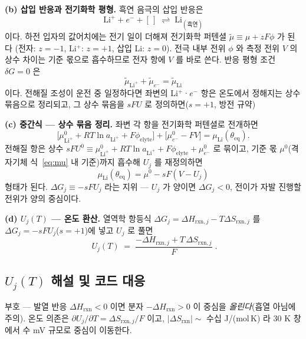 \documentclass[11pt,a4paper]{article}
\newcommand{\eq}{\mathrm{eq}}
\newcommand{\rxn}{\mathrm{rxn}}
\begin{document}
\textbf{(b) 삽입 반응과 전기화학 평형.} 흑연 음극의 삽입 반응은
\begin{equation}
\mathrm{Li}^+ + e^- + [\,] \;\rightleftharpoons\; \mathrm{Li}_{(\text{흑연})}
\label{eq:insertion}
\end{equation}
이다. 하전 입자의 값어치에는 전기 일이 더해져 전기화학 퍼텐셜 $\tilde\mu \equiv \mu + zF\phi$ 가 된다
(전자: $z=-1$, Li$^+$: $z=+1$, 삽입 Li: $z=0$). 전극 내부 전위 $\phi$ 와 측정 전위 $V$ 의 상수 차이는
기준 몫으로 흡수하므로 전자 항에 $V$ 를 바로 쓴다. 반응 평형 조건 $\delta G = 0$ 은
\begin{equation}
\tilde\mu_{\mathrm{Li}^+} + \tilde\mu_{e^-} = \tilde\mu_{\mathrm{Li}}
\label{eq:eqbalance}
\end{equation}
이다. 전해질 조성이 운전 중 일정하다면 좌변의 Li$^+$·$e^-$ 항은 온도에서 정해지는 상수 묶음으로 정리되고,
그 상수 묶음을 $sFU$ 로 정의하면($s=+1$, 방전 규약)

\textbf{(c) 중간식 — 상수 묶음 정리.} 좌변 각 항을 전기화학 퍼텐셜로 전개하면
\begin{equation}
\bigl[\mu^0_{\mathrm{Li}^+} + RT\ln a_{\mathrm{Li}^+} + F\phi_\mathrm{elyte}\bigr]
+ \bigl[\mu^0_{e^-} - FV\bigr]
= \mu_{\mathrm{Li}}(\theta_\eq).
\label{eq:eqexpand}
\end{equation}
전해질 항은 상수 $sFU^0 \equiv \mu^0_{\mathrm{Li}^+} + RT\ln a_{\mathrm{Li}^+} + F\phi_\mathrm{elyte} + \mu^0_{e^-}$
로 묶이고, 기준 몫 $\mu^0$(격자기체 식~\eqref{eq:mu} 내 기준)까지 흡수해 $U_j$ 를 재정의하면
\begin{equation}
\mu_{\mathrm{Li}}(\theta_\eq) = \mu^0 - sF(V-U_j)
\label{eq:eqcond}
\end{equation}
형태가 된다. $\Delta G_j \equiv -sFU_j$ 라는 지위 — $U_j$ 가 양이면 $\Delta G_j < 0$, 전이가 자발 진행할
전위가 양의 중심이다.

\textbf{(d) $U_j(T)$ — 온도 환산.} 열역학 항등식 $\Delta G_j = \Delta H_{\rxn,j} - T\Delta S_{\rxn,j}$ 를
$\Delta G_j = -sFU_j$($s=+1$)에 넣고 $U_j$ 로 풀면
\begin{equation}
\boxed{\;U_j(T)\;=\;\frac{-\Delta H_{\rxn,j}+T\,\Delta S_{\rxn,j}}{F}\;.}
\label{eq:Uj}
\end{equation}

\subsection{$U_j(T)$ 해설 및 코드 대응}
부호 — 발열 반응 $\Delta H_\rxn<0$ 이면 분자 $-\Delta H_\rxn>0$ 이 중심을 \emph{올린다}(흡열 아님에 주의).
온도 의존은 $\partial U_j/\partial T=\Delta S_{\rxn,j}/F$ 이고, $|\Delta S_\rxn|\sim$ 수십 J/(mol\,K) 라
$30$ K 창에서 수 mV 규모로 중심이 이동한다.
\end{document}
